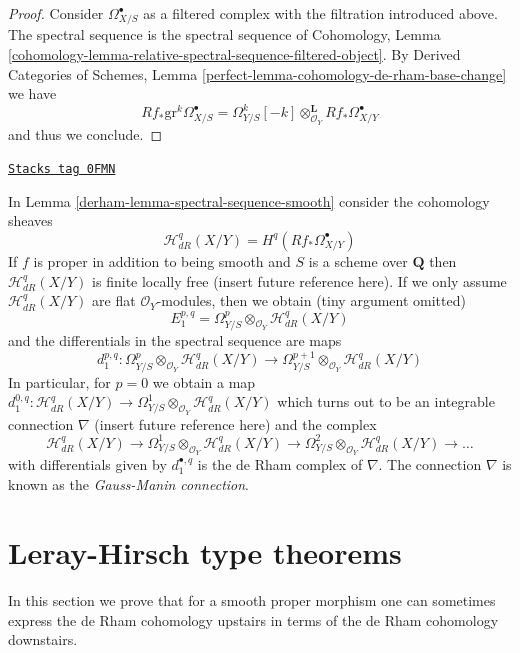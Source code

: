 \begin{proof}
Consider $\Omega^\bullet_{X/S}$ as a filtered complex with the
filtration introduced above. The spectral sequence is the
spectral sequence of Cohomology, Lemma
\ref{cohomology-lemma-relative-spectral-sequence-filtered-object}.
By Derived Categories of Schemes, Lemma
\ref{perfect-lemma-cohomology-de-rham-base-change} we have
$$
Rf_*\text{gr}^k\Omega^\bullet_{X/S} =
\Omega^k_{Y/S}[-k] \otimes_{\mathcal{O}_Y}^\mathbf{L} Rf_*\Omega^\bullet_{X/Y}
$$
and thus we conclude.
\end{proof}

\begin{remark}
\label{derham-remark-gauss-manin}
\href{https://stacks.math.columbia.edu/tag/0FMN}{\texttt{Stacks tag 0FMN}}

In Lemma \ref{derham-lemma-spectral-sequence-smooth} consider the cohomology sheaves
$$
\mathcal{H}^q_{dR}(X/Y) = H^q(Rf_*\Omega^\bullet_{X/Y})
$$
If $f$ is proper in addition to being smooth and $S$ is a scheme over
$\mathbf{Q}$ then $\mathcal{H}^q_{dR}(X/Y)$ is finite locally free (insert
future reference here). If we only assume $\mathcal{H}^q_{dR}(X/Y)$
are flat $\mathcal{O}_Y$-modules, then we obtain (tiny argument omitted)
$$
E_1^{p, q} =
\Omega^p_{Y/S} \otimes_{\mathcal{O}_Y} \mathcal{H}^q_{dR}(X/Y)
$$
and the differentials in the spectral sequence are maps
$$
d_1^{p, q} :
\Omega^p_{Y/S} \otimes_{\mathcal{O}_Y} \mathcal{H}^q_{dR}(X/Y)
\longrightarrow
\Omega^{p + 1}_{Y/S} \otimes_{\mathcal{O}_Y} \mathcal{H}^q_{dR}(X/Y)
$$
In particular, for $p = 0$ we obtain a map
$d_1^{0, q} : \mathcal{H}^q_{dR}(X/Y) \to
\Omega^1_{Y/S} \otimes_{\mathcal{O}_Y} \mathcal{H}^q_{dR}(X/Y)$
which turns out to be an integrable connection
$\nabla$ (insert future reference here)
and the complex
$$
\mathcal{H}^q_{dR}(X/Y) \to
\Omega^1_{Y/S} \otimes_{\mathcal{O}_Y} \mathcal{H}^q_{dR}(X/Y) \to
\Omega^2_{Y/S} \otimes_{\mathcal{O}_Y} \mathcal{H}^q_{dR}(X/Y) \to \ldots
$$
with differentials given by $d_1^{\bullet, q}$
is the de Rham complex of $\nabla$.
The connection $\nabla$ is known as the {\it Gauss-Manin connection}.
\end{remark}

\section{Leray-Hirsch type theorems}
\label{derham-section-leray-hirsch}
In this section we prove that for a smooth proper morphism one
can sometimes express the de Rham cohomology upstairs in terms
of the de Rham cohomology downstairs.

